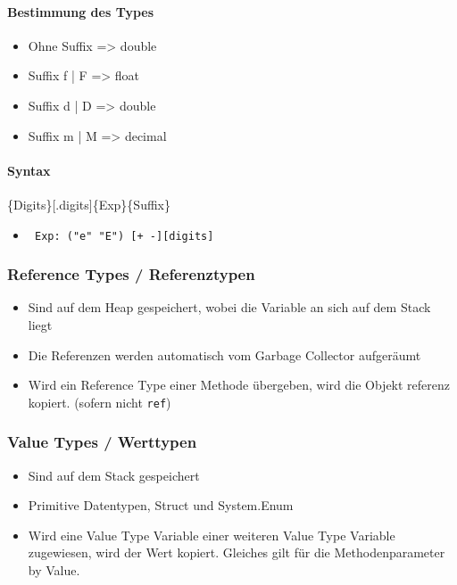 \documentclass[
a4paper,
oneside,
10pt,
fleqn,
headsepline,
toc=listofnumbered, 
bibliography=totocnumbered]{scrartcl}
\begin{document}
\paragraph{Bestimmung des Types}
\begin{itemize}
  \item Ohne Suffix => double
  \item Suffix f | F => float
  \item Suffix d | D => double
  \item Suffix m | M => decimal
\end{itemize}

\paragraph{Syntax}
\{Digits\}[.{digits}]\{Exp\}\{Suffix\}
\begin{itemize}
  \item \verb| Exp: ("e" "E") [+ -][digits]|
\end{itemize}

\clearpage

\subsubsection{Reference Types / Referenztypen}
\begin{itemize}
	\item Sind auf dem Heap gespeichert, wobei die Variable an sich auf dem Stack liegt
	\item Die Referenzen werden automatisch vom Garbage Collector aufgeräumt
	\item Wird ein Reference Type einer Methode übergeben, wird die Objekt referenz kopiert. (sofern nicht \lstinline|ref|)
\end{itemize}

\subsubsection{Value Types / Werttypen}
\begin{itemize}
	\item Sind auf dem Stack gespeichert
	\item Primitive Datentypen, Struct und System.Enum
	\item Wird eine Value Type Variable einer weiteren Value Type Variable zugewiesen, wird der Wert kopiert. Gleiches gilt für die Methodenparameter by Value.
\end{itemize}
\end{document}
